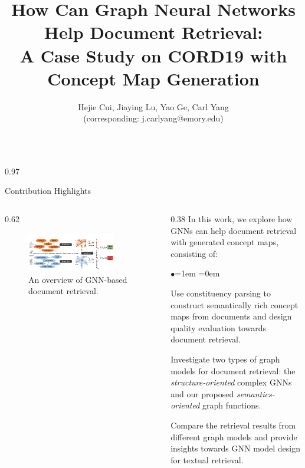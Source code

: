 \documentclass[serif,onlymath,final,xcolor=table]{beamer}
\title{How Can Graph Neural Networks Help Document Retrieval: \\A Case Study on CORD19 with Concept Map Generation}
\author{Hejie Cui, Jiaying Lu, Yao Ge, Carl Yang \\(corresponding: j.carlyang@emory.edu)}
\institute{Department of Computer Science, Emory University, Atlanta, GA 30322, USA}
\newlength{\sepwidth}
\newlength{\colwidth}
\begin{document}
\begin{frame}
\begin{columns}[t]

\begin{column}{0.97\linewidth}

\begin{block}{Contribution Highlights}
\begin{columns}	
\begin{column}{0.62\linewidth}
\begin{figure}[h]
\centering
\includegraphics[width=0.8\textwidth]{figures/toy-example.pdf}
\caption{An overview of GNN-based document retrieval. }
\label{fig:model}
\end{figure}
\end{column}

\begin{column}{0.38\linewidth}
In this work, we explore how GNNs can help document retrieval with generated concept maps, consisting of:
\begin{list}{$\bullet$}{\leftmargin=1em \itemindent=0em}
\item Use constituency parsing to construct semantically rich concept maps from documents and design quality evaluation towards document retrieval.
\item Investigate two types of graph models for document retrieval: the \textit{structure-oriented} complex GNNs and our proposed \textit{semantics-oriented} graph functions.
\item Compare the retrieval results from different graph models and provide insights towards GNN model design for textual retrieval.
\end{list}
\end{column}

\end{columns}
\end{block}

\end{column}
\end{columns}


\end{frame}
\end{document}
